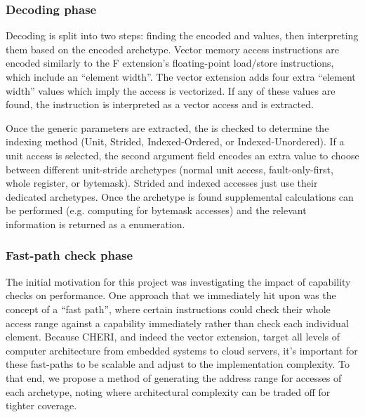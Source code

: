 \subsubsection{Decoding phase}
Decoding is split into two steps: finding the encoded  and  values, then interpreting them based on the encoded archetype.
Vector memory access instructions are encoded similarly to the F extension's floating-point load/store instructions, which include an ``element width''.
The vector extension adds four extra ``element width'' values which imply the access is vectorized.
If any of these values are found, the instruction is interpreted as a vector access and  is extracted.

Once the generic parameters are extracted, the  is checked to determine the indexing method (Unit, Strided, Indexed-Ordered, or Indexed-Unordered).
If a unit access is selected, the second argument field encodes an extra value to choose between different unit-stride archetypes (normal unit access, fault-only-first, whole register, or bytemask).
Strided and indexed accesses just use their dedicated archetypes.
Once the archetype is found supplemental calculations can be performed (e.g. computing  for bytemask accesses) and the relevant information is returned as a  enumeration.


\subsubsection{Fast-path check phase}
The initial motivation for this project was investigating the impact of capability checks on performance.
One approach that we immediately hit upon was the concept of a \enquote{fast path}, where certain instructions could check their whole access range against a capability immediately rather than check each individual element.
Because CHERI, and indeed the vector extension, target all levels of computer architecture from embedded systems to cloud servers, it's important for these fast-paths to be scalable and adjust to the implementation complexity.
To that end, we propose a method of generating the address range for accesses of each archetype, noting where architectural complexity can be traded off for tighter coverage.

